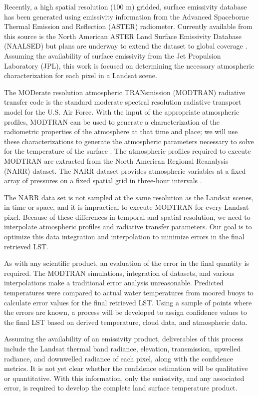 \documentclass{book}
\begin{document}
Recently, a high spatial resolution (100 m) gridded, surface emissivity database has been generated using emissivity information from the Advanced Spaceborne Thermal Emission and Reflection (ASTER) radiometer.  Currently available from this source is the North American ASTER Land Surface Emissivity Database (NAALSED) but plans are underway to extend the dataset to global coverage \cite{hulley_2009}.  Assuming the availability of surface emissivity from the Jet Propulsion Laboratory (JPL), this work is focused on determining the necessary atmospheric characterization for each pixel in a Landsat scene.

The MODerate resolution atmospheric TRANsmission (MODTRAN) radiative transfer code is the standard moderate spectral resolution radiative transport model for the U.S. Air Force.  With the input of the appropriate atmospheric profiles, MODTRAN can be used to generate a characterization of the radiometric properties of the atmosphere at that time and place; we will use these characterizations to generate the atmospheric parameters necessary to solve for the temperature of the surface \cite{modtran}.  The atmospheric profiles required to execute MODTRAN are extracted from the North American Regional Reanalysis (NARR) dataset.  The NARR dataset provides atmospheric variables at a fixed array of pressures on a fixed spatial grid in three-hour intervals \cite{narr}.

The NARR data set is not sampled at the same resolution as the Landsat scenes, in time or space, and it is impractical to execute MODTRAN for every Landsat pixel.  Because of these differences in temporal and spatial resolution, we need to interpolate atmospheric profiles and radiative transfer parameters.  Our goal is to optimize this data integration and interpolation to minimize errors in the final retrieved LST.

As with any scientific product, an evaluation of the error in the final quantity is required.  The MODTRAN simulations, integration of datasets, and various interpolations make a traditional error analysis unreasonable.  Predicted temperatures were compared to actual water temperatures from moored buoys to calculate error values for the final retrieved LST.  Using a sample of points where the errors are known, a process will be developed to assign confidence values to the final LST based on derived temperature, cloud data, and atmospheric data.

Assuming the availability of an emissivity product, deliverables of this process include the Landsat thermal band radiance, elevation, transmission, upwelled radiance, and downwelled radiance of each pixel, along with the confidence metrics.  It is not yet clear whether the confidence estimation will be qualitative or quantitative.  With this information, only the emissivity, and any associated error, is required to develop the complete land surface temperature product.
\end{document}
